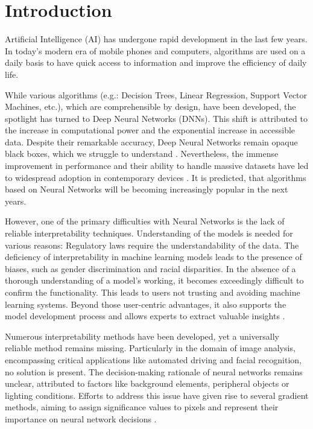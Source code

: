 
\chapter{Introduction}

Artificial Intelligence (AI) has undergone rapid development in the last few years. In today's modern era of mobile phones and computers, algorithms are used on a daily basis to have quick access to information and improve the efficiency of daily life.

While various algorithms (e.g.: Decision Trees, Linear Regression, Support Vector Machines, etc.), which are comprehensible by design, have been developed, the spotlight has turned to Deep Neural Networks (DNNs). This shift is attributed to the increase in computational power and the exponential increase in accessible data. Despite their remarkable accuracy, Deep Neural Networks remain opaque black boxes, which we struggle to understand \cite{Samek_2019}. Nevertheless, the immense improvement in performance and their ability to handle massive datasets have led to widespread adoption in contemporary devices \cite{zhang2022ai}. It is predicted, that algorithms based on Neural Networks will be becoming increasingly popular in the next years.

However, one of the primary difficulties with Neural Networks is the lack of reliable interpretability techniques. Understanding of the models is needed for various reasons: Regulatory laws require the understandability of the data. The deficiency of interpretability in machine learning models leads to the presence of biases, such as gender discrimination and racial disparities. In the absence of a thorough understanding of a model's working, it becomes exceedingly difficult to confirm the functionality. This leads to users not trusting and avoiding machine learning systems. Beyond those user-centric advantages, it also supports the model development process and allows experts to extract valuable insights \cite{Samek_2019}.
 
Numerous interpretability methods have been developed, yet a universally reliable method remains missing. Particularly in the domain of image analysis, encompassing critical applications like automated driving and facial recognition, no solution is present. The decision-making rationale of neural networks remains unclear, attributed to factors like background elements, peripheral objects or lighting conditions. Efforts to address this issue have given rise to several gradient methods, aiming to assign significance values to pixels and represent their importance on neural network decisions \cite{Samek_2019}.

